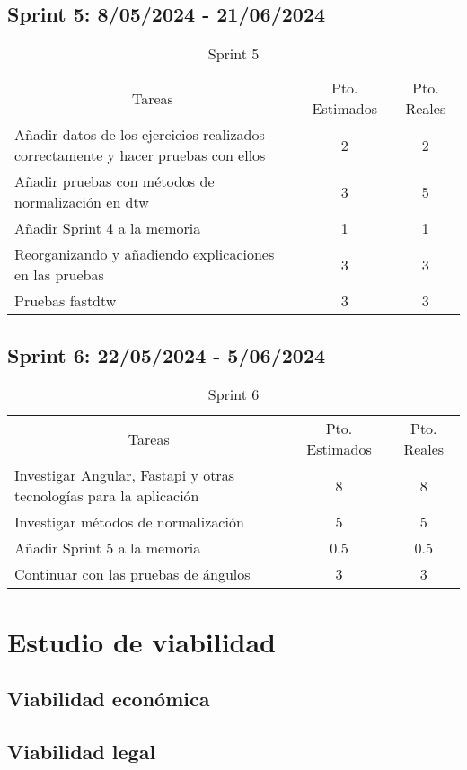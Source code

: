 \subsection{Sprint 5: 8/05/2024 - 21/06/2024 }
\begin{table}[H]
	\begin{tabular}{lcc}
		\multicolumn{1}{c}{Tareas} & Pto. Estimados & Pto. Reales\\
	    Añadir datos de los ejercicios realizados correctamente y hacer pruebas con ellos & 2 & 2 \\
		Añadir pruebas con métodos de normalización en dtw & 3 & 5 \\
		Añadir Sprint 4 a la memoria & 1 &1 \\
		Reorganizando y añadiendo explicaciones en las pruebas & 3 & 3 \\
		Pruebas fastdtw & 3 & 3 \\
	\end{tabular}
	\caption{Sprint 5}
	\label{sprint5}
\end{table}

\subsection{Sprint 6: 22/05/2024 - 5/06/2024 }
\begin{table}[H]
	\begin{tabular}{lcc}
		\multicolumn{1}{c}{Tareas} & Pto. Estimados & Pto. Reales\\
		Investigar Angular, Fastapi y otras tecnologías para la aplicación & 8 & 8 \\
		Investigar métodos de normalización & 5 & 5 \\
		Añadir Sprint 5 a la memoria & 0.5 &0.5 \\
		Continuar con las pruebas de ángulos & 3 & 3 \\
	\end{tabular}
	\caption{Sprint 6}
	\label{sprint6}
\end{table}

\section{Estudio de viabilidad}

\subsection{Viabilidad económica}

\subsection{Viabilidad legal}


